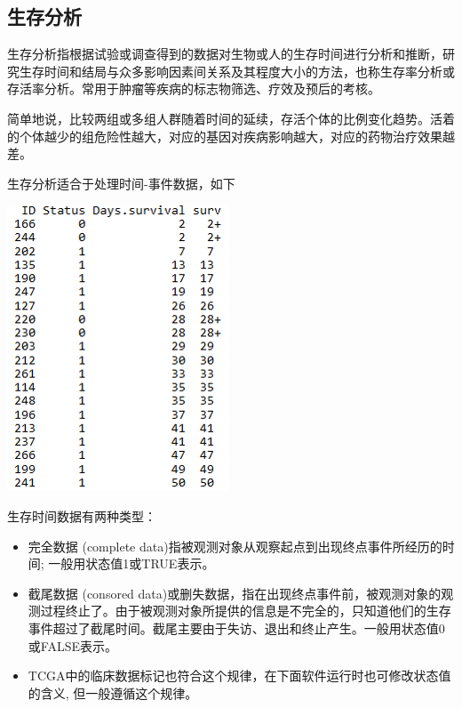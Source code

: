 \documentclass[]{article}
\providecommand{\tightlist}{%
  \setlength{\itemsep}{0pt}\setlength{\parskip}{0pt}}
\numberwithin{figure}{section}
\numberwithin{table}{section}
\theoremstyle{definition}
\theoremstyle{definition}
\theoremstyle{definition}
\theoremstyle{remark}
\begin{document}
\subsection{生存分析}

生存分析指根据试验或调查得到的数据对生物或人的生存时间进行分析和推断，研究生存时间和结局与众多影响因素间关系及其程度大小的方法，也称生存率分析或存活率分析。常用于肿瘤等疾病的标志物筛选、疗效及预后的考核。

简单地说，比较两组或多组人群随着时间的延续，存活个体的比例变化趋势。活着的个体越少的组危险性越大，对应的基因对疾病影响越大，对应的药物治疗效果越差。

生存分析适合于处理时间-事件数据，如下

\begin{center}\includegraphics[width=0.95\linewidth,height=0.7\textheight,keepaspectratio]{images/surv_input_data} \end{center}

生存时间数据有两种类型：

\begin{itemize}
\tightlist
\item
  完全数据 (complete
  data)指被观测对象从观察起点到出现终点事件所经历的时间;
  一般用状态值1或TRUE表示。
\item
  截尾数据 (consored
  data)或删失数据，指在出现终点事件前，被观测对象的观测过程终止了。由于被观测对象所提供的信息是不完全的，只知道他们的生存事件超过了截尾时间。截尾主要由于失访、退出和终止产生。一般用状态值0或FALSE表示。
\item
  TCGA中的临床数据标记也符合这个规律，在下面软件运行时也可修改状态值的含义,
  但一般遵循这个规律。
\end{itemize}
\end{document}
